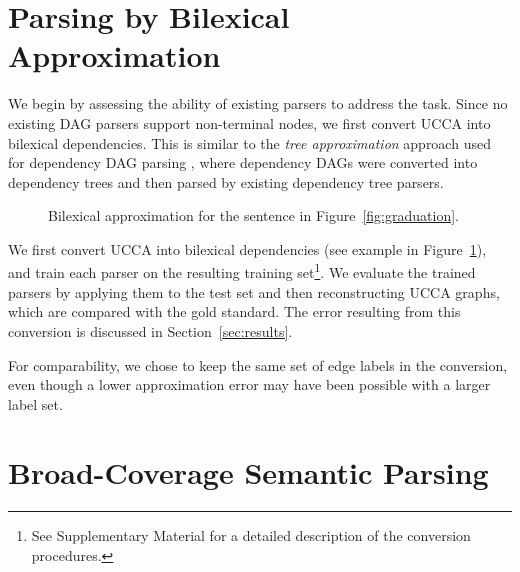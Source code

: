 \documentclass[11pt]{article}
\newcommand{\secref}[1]{Section~\ref{#1}}
\newcommand{\figref}[1]{Figure~\ref{#1}}
\begin{document}
\section{Parsing by Bilexical Approximation}\label{sec:conversion}

We begin by assessing the ability of existing parsers to address the task.
Since no existing DAG parsers support non-terminal nodes, we first convert UCCA into bilexical
dependencies.
This is similar to the \textit{tree approximation} approach used for dependency DAG parsing
\cite{agic2015semantic,fernandez2015parsing},
where dependency DAGs were converted into dependency trees
and then parsed by existing dependency tree parsers.

\begin{figure}
  \caption{Bilexical approximation for the sentence in \figref{fig:graduation}.}
  \label{fig:bilexical_example}
\end{figure}

We first convert UCCA into bilexical dependencies
(see example in \figref{fig:bilexical_example}), and train each parser on the resulting
training set\footnote{See Supplementary Material for a detailed description of
the conversion procedures.}.
We evaluate the trained parsers by applying them to the test set
and then reconstructing UCCA graphs, which are compared with the gold standard.
The error resulting from this conversion is discussed in
\secref{sec:results}.

For comparability, we chose to keep the same set of edge labels in the conversion,
even though a lower approximation error may have been possible with a larger label set.

\section{Broad-Coverage Semantic Parsing}\label{sec:direct_approach}
\end{document}
